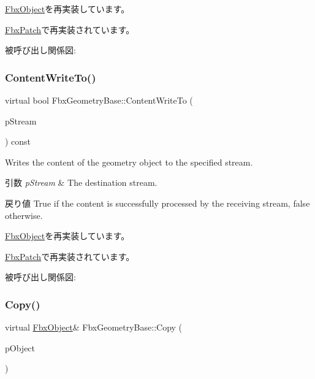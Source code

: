 \hyperlink{class_fbx_object_aeb4255bda633e1986730748758a7cf6c}{Fbx\+Object}を再実装しています。



\hyperlink{class_fbx_patch_ad1aac4a2e0e820f27ff9a0123ba5756e}{Fbx\+Patch}で再実装されています。

被呼び出し関係図\+:
\mbox{\label{class_fbx_geometry_base_a7b80ccbcd2b15bbedbe7dd7e0739a3b3}} 
\subsubsection{\texorpdfstring{Content\+Write\+To()}{ContentWriteTo()}}
{\footnotesize\ttfamily virtual bool Fbx\+Geometry\+Base\+::\+Content\+Write\+To (\begin{DoxyParamCaption}\item[{\hyperlink{class_fbx_stream}{Fbx\+Stream} \&}]{p\+Stream }\end{DoxyParamCaption}) const\hspace{0.3cm}{\ttfamily [virtual]}}

Writes the content of the geometry object to the specified stream. 
\begin{DoxyParams}{引数}
{\em p\+Stream} & The destination stream. \\
\hline
\end{DoxyParams}
\begin{DoxyReturn}{戻り値}
{\ttfamily True} if the content is successfully processed by the receiving stream, {\ttfamily false} otherwise. 
\end{DoxyReturn}


\hyperlink{class_fbx_object_ab8a59df9233cdfeaae05e5b6d15f5101}{Fbx\+Object}を再実装しています。



\hyperlink{class_fbx_patch_a2ecc16ad355ca521c921ec3731719585}{Fbx\+Patch}で再実装されています。

被呼び出し関係図\+:
\mbox{\label{class_fbx_geometry_base_a2c3754831338327259c35caebbf379d3}} 
\subsubsection{\texorpdfstring{Copy()}{Copy()}}
{\footnotesize\ttfamily virtual \hyperlink{class_fbx_object}{Fbx\+Object}\& Fbx\+Geometry\+Base\+::\+Copy (\begin{DoxyParamCaption}\item[{const \hyperlink{class_fbx_object}{Fbx\+Object} \&}]{p\+Object }\end{DoxyParamCaption})\hspace{0.3cm}{\ttfamily [virtual]}}

